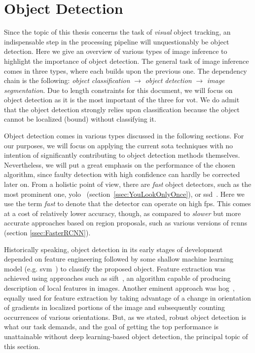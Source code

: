\section{Object Detection}

Since the topic of this thesis concerns the task of \emph{visual} object tracking, an indispensable step in the processing pipeline will unquestionably be object detection. Here we give an overview of various types of image inference to highlight the importance of object detection. The general task of image inference comes in three types, where each builds upon the previous one. The dependency chain is the following: \emph{object classification} $\to$ \emph{object detection} $\to$ \emph{image segmentation}. Due to length constraints for this document, we will focus on object detection as it is the most important of the three for \gls{vot}. We do admit that the object detection strongly relies upon classification because the object cannot be localized (bound) without classifying it.

Object detection comes in various types discussed in the following sections. For our purposes, we will focus on applying the current \gls{sota} techniques with no intention of significantly contributing to object detection methods themselves. Nevertheless, we will put a great emphasis on the performance of the chosen algorithm, since faulty detection with high confidence can hardly be corrected later on. From a holistic point of view, there are \emph{fast} object detectors, such as the most prominent one, \gls{yolo}~\cite{Redmon2016} (section~\ref{ssec:YouLookOnlyOnce}), or \gls{ssd}~\cite{Liu2016}. Here we use the term \emph{fast} to denote that the detector can operate on high \gls{fps}. This comes at a cost of relatively lower accuracy, though, as compared to \emph{slower} but more accurate approaches based on region proposals, such as various versions of \glspl{rcnn} (section \ref{ssec:FasterRCNN}).

Historically speaking, object detection in its early stages of development depended on feature engineering followed by some shallow machine learning model (e.g. \gls{svm}~\cite{cortes1995support}) to classify the proposed object. Feature extraction was achieved using approaches such as \gls{sift}~\cite{Lowe1999}, an algorithm capable of producing description of local features in images. Another eminent approach was \gls{hog}~\cite{osti_6007283}, equally used for feature extraction by taking advantage of a change in orientation of gradients in localized portions of the image and subsequently counting occurrences of various orientations. But, as we stated, robust object detection is what our task demands, and the goal of getting the top performance is unattainable without deep learning-based object detection, the principal topic of this section.

